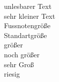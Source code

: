 \documentclass[a4paper, pdftex, 12pt,ngerman]{article}
\begin{document}
\tiny unlesbarer Text \\
\scriptsize sehr kleiner Text\\
\footnotesize Fussnotengröße \\
\normalsize Standartgröße \\
\large größer\\
\Large noch größer \\
\LARGE sehr Groß \\
\huge riesig \\
\end{document}
